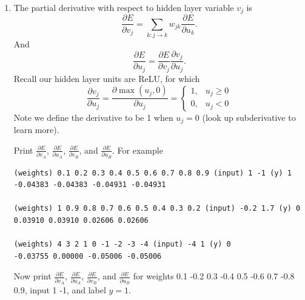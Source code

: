 \documentclass[a4paper]{article}
\theoremstyle{definition}
\newenvironment{soln}{
    \leavevmode\color{blue}\ignorespaces
}{}
\begin{document}
\begin{enumerate}
Print $E$, $\frac{\partial E}{\partial v_C}$, and $\frac{\partial E}{\partial u_C}$. 
For example,
\begin{verbatim}
(weights) 0.1 0.2 0.3 0.4 0.5 0.6 0.7 0.8 0.9 (input) 1 -1 (y) 1
0.03778 -0.27488 -0.05479

(weights) 1 0.9 0.8 0.7 0.6 0.5 0.4 0.3 0.2 (input) -0.2 1.7 (y) 0
0.31402 0.79249 0.13032

(weights) 4 3 2 1 0 -1 -2 -3 -4 (input) -4 1 (y) 0
0.00710 0.11920 0.01252
\end{verbatim}

Now compute $E$, $\frac{\partial E}{\partial v_C}$, and $\frac{\partial E}{\partial u_C}$ for weights 0.1 -0.2 0.3 -0.4 0.5 -0.6 0.7 -0.8 0.9, input 1 -1, and label $y=1$.

\begin{soln}
$E = 0.02187382,  \frac{\partial E}{\partial v_C} = -0.20915937 ,  \frac{\partial E}{\partial u_C} = -0.03459741$ 
\end{soln}


\item 
The partial derivative with respect to hidden layer variable $v_j$ is
$$\frac{\partial E}{\partial v_j} = \sum_{k: j\rightarrow k} w_{jk} \frac{\partial E}{\partial u_k}.$$
And 
$$\frac{\partial E}{\partial u_j} = \frac{\partial E}{\partial v_j} \frac{\partial v_j}{\partial u_j}.$$
Recall our hidden layer units are ReLU, for which
$$\frac{\partial v_j}{\partial u_j}=\frac{\partial \max(u_j, 0)}{\partial u_j}=\left\{
\begin{array}{ll}
1, & u_j \ge 0 \\
0, & u_j < 0 
\end{array}
\right.$$
Note we define the derivative to be 1 when $u_j=0$ (look up subderivative to learn more).

Print $\frac{\partial E}{\partial v_A}$, $\frac{\partial E}{\partial u_A}$, $\frac{\partial E}{\partial v_B}$, and $\frac{\partial E}{\partial u_B}$.
For example
\begin{verbatim}
(weights) 0.1 0.2 0.3 0.4 0.5 0.6 0.7 0.8 0.9 (input) 1 -1 (y) 1
-0.04383 -0.04383 -0.04931 -0.04931

(weights) 1 0.9 0.8 0.7 0.6 0.5 0.4 0.3 0.2 (input) -0.2 1.7 (y) 0
0.03910 0.03910 0.02606 0.02606

(weights) 4 3 2 1 0 -1 -2 -3 -4 (input) -4 1 (y) 0
-0.03755 0.00000 -0.05006 -0.05006
\end{verbatim}
Now print $\frac{\partial E}{\partial v_A}$, $\frac{\partial E}{\partial u_A}$, $\frac{\partial E}{\partial v_B}$, and $\frac{\partial E}{\partial u_B}$ for weights 0.1 -0.2 0.3 -0.4 0.5 -0.6 0.7 -0.8 0.9, input 1 -1, and label $y=1$.


\end{enumerate}
\end{document}

